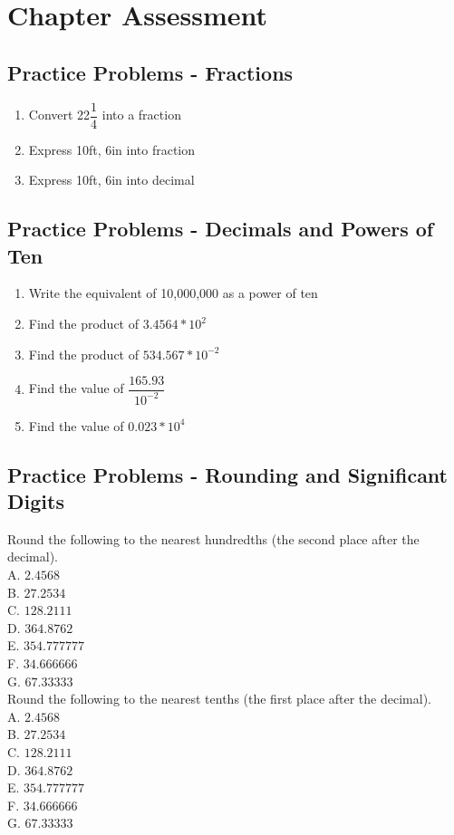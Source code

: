 
\chapter*{Chapter Assessment}
\section*{Practice Problems - Fractions}
\begin{enumerate}
\item Convert 22$\dfrac{1}{4}$ into a fraction
\item Express 10ft, 6in into fraction
\item Express 10ft, 6in into decimal
\end{enumerate}

\vspace{1cm}
\section*{Practice Problems - Decimals and Powers of Ten}
\begin{enumerate}
\item Write the equivalent of 10,000,000 as a power of ten
\item Find the product of $3.4564*10^2$
\item Find the product of $534.567*10^{-2}$
\vspace{0.2cm}
\item Find the value of $\dfrac{165.93}{10^{-2}}$
\vspace{0.2cm}
\item Find the value of $0.023*10^4$
\end{enumerate}
\vspace{1cm}


\section*{Practice Problems - Rounding and Significant Digits}
Round the following to the nearest hundredths (the second place after the decimal).\\
A. $2.4568$\\
B. $27.2534$\\
C. $128.2111$\\
D. $364.8762$\\
E. $354.777777$\\
F. $34.666666$\\
G. $67.33333$\\
\vspace{0.5cm}
Round the following to the nearest tenths (the first place after the decimal).\\
A. $2.4568$\\
B. $27.2534$\\
C. $128.2111$\\
D. $364.8762$\\
E. $354.777777$\\
F. $34.666666$\\
G. $67.33333$


